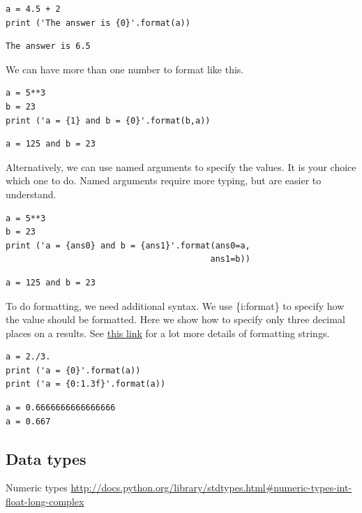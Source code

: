 \documentclass[11pt]{article}
\begin{document}
\begin{verbatim}
a = 4.5 + 2
print ('The answer is {0}'.format(a))
\end{verbatim}

\begin{verbatim}
The answer is 6.5
\end{verbatim}


We can have more than one number to format like this.
\begin{verbatim}
a = 5**3
b = 23
print ('a = {1} and b = {0}'.format(b,a))
\end{verbatim}

\begin{verbatim}
a = 125 and b = 23
\end{verbatim}

Alternatively, we can use named arguments to specify the values. It is your choice which one to do. Named arguments require more typing, but are easier to understand.
\begin{verbatim}
a = 5**3
b = 23
print ('a = {ans0} and b = {ans1}'.format(ans0=a,
                                         ans1=b))
\end{verbatim}

\begin{verbatim}
a = 125 and b = 23
\end{verbatim}

To do formatting, we need additional syntax. We use \{i:format\} to specify how the value should be formatted. Here we show how to specify only three decimal places on a results. See \href{http://docs.python.org/library/stdtypes.html\#string-formatting-operations}{this link} for a lot more details of formatting strings.
\begin{verbatim}
a = 2./3.
print ('a = {0}'.format(a))
print ('a = {0:1.3f}'.format(a))
\end{verbatim}

\begin{verbatim}
a = 0.6666666666666666
a = 0.667
\end{verbatim}


\subsection{Data types}
\label{sec:org81a08e9}
Numeric types \url{http://docs.python.org/library/stdtypes.html\#numeric-types-int-float-long-complex}
\end{document}
